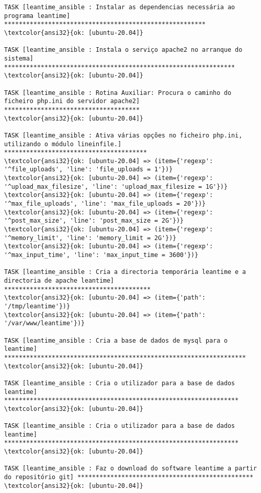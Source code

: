 \documentclass{scrartcl}
\begin{document}
\begin{Verbatim}
TASK [leantime_ansible : Instalar as dependencias necessária ao programa leantime] *******************************************************
\textcolor{ansi32}{ok: [ubuntu-20.04]}

TASK [leantime_ansible : Instala o serviço apache2 no arranque do sistema] ***************************************************************
\textcolor{ansi32}{ok: [ubuntu-20.04]}

TASK [leantime_ansible : Rotina Auxiliar: Procura o caminho do ficheiro php.ini do servidor apache2] *************************************
\textcolor{ansi32}{ok: [ubuntu-20.04]}

TASK [leantime_ansible : Ativa várias opções no ficheiro php.ini, utilizando o módulo lineinfile.] ***************************************
\textcolor{ansi32}{ok: [ubuntu-20.04] => (item={'regexp': '^file_uploads', 'line': 'file_uploads = 1'})}
\textcolor{ansi32}{ok: [ubuntu-20.04] => (item={'regexp': '^upload_max_filesize', 'line': 'upload_max_filesize = 1G'})}
\textcolor{ansi32}{ok: [ubuntu-20.04] => (item={'regexp': '^max_file_uploads', 'line': 'max_file_uploads = 20'})}
\textcolor{ansi32}{ok: [ubuntu-20.04] => (item={'regexp': '^post_max_size', 'line': 'post_max_size = 2G'})}
\textcolor{ansi32}{ok: [ubuntu-20.04] => (item={'regexp': '^memory_limit', 'line': 'memory_limit = 2G'})}
\textcolor{ansi32}{ok: [ubuntu-20.04] => (item={'regexp': '^max_input_time', 'line': 'max_input_time = 3600'})}

TASK [leantime_ansible : Cria a directoria temporária leantime e a directoria de apache leantime] ****************************************
\textcolor{ansi32}{ok: [ubuntu-20.04] => (item={'path': '/tmp/leantime'})}
\textcolor{ansi32}{ok: [ubuntu-20.04] => (item={'path': '/var/www/leantime'})}

TASK [leantime_ansible : Cria a base de dados de mysql para o leantime] ******************************************************************
\textcolor{ansi32}{ok: [ubuntu-20.04]}

TASK [leantime_ansible : Cria o utilizador para a base de dados leantime] ****************************************************************
\textcolor{ansi32}{ok: [ubuntu-20.04]}

TASK [leantime_ansible : Cria o utilizador para a base de dados leantime] ****************************************************************
\textcolor{ansi32}{ok: [ubuntu-20.04]}

TASK [leantime_ansible : Faz o download do software leantime a partir do repositório git] ************************************************
\textcolor{ansi32}{ok: [ubuntu-20.04]}


\end{Verbatim}
\end{document}
